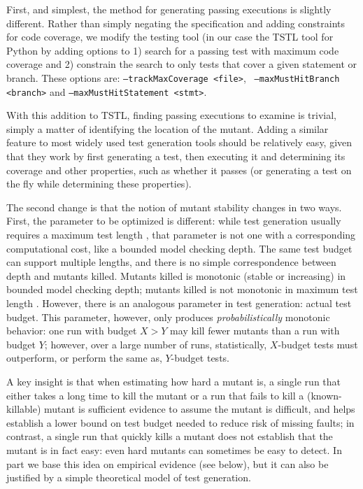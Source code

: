 \documentclass{svjour3}
\begin{document}
First, and simplest, the method for generating passing executions is
slightly different.  Rather than simply negating the specification and
adding constraints for code coverage, we modify the testing tool (in
our case the TSTL tool for Python \cite{tstlsttt,NFM15} by adding
options to 1) search for a passing test with maximum code coverage and
2) constrain the search to only tests that cover a given statement or
branch.  These options are:  {\tt --trackMaxCoverage <file>}, {\tt
  --maxMustHitBranch <branch>} and {\tt --maxMustHitStatement <stmt>}.

With this addition to TSTL, finding passing executions to examine is
trivial, simply a matter of identifying the location of the mutant.
Adding a similar feature to most widely used test generation tools
should be
relatively easy, given that they work by first generating a test, then
executing it and determining its coverage and other properties, such as
whether it passes (or generating a test on the fly while determining
these properties).  

The second change is that the notion of mutant stability changes in
two ways.  First, the parameter to be optimized is different:  while
test generation usually requires a maximum test length \cite{ASE08},
that parameter is not one with a corresponding computational cost,
like a bounded model checking depth.  The same test budget can support
multiple lengths, and there is no simple correspondence between depth
and mutants killed.  Mutants killed is monotonic (stable or
increasing) in bounded model checking depth; mutants killed is not
monotonic in maximum test length \cite{ASE08}.  However, there is an
analogous parameter in test generation:  actual test budget.  This
parameter, however, only produces \emph{probabilistically} \cite{arcuri2014hitchhiker} monotonic
behavior:  one run with budget $X > Y$ may kill fewer mutants than a
run with budget $Y$; however, over a large number of runs,
statistically, $X$-budget tests must outperform, or perform the same
as, $Y$-budget tests.

A key insight is that when estimating how hard a mutant is, a single
run that either takes a long time to kill the mutant or a run that
fails to kill a (known-killable) mutant is sufficient evidence to
assume the mutant is difficult, and helps establish a lower bound on
test budget needed to reduce risk of missing faults; in contrast, a
single run that quickly kills a mutant does not establish that the
mutant is in fact easy:  even hard mutants can sometimes be easy to
detect.  In part we base this idea on empirical evidence (see below),
but it can also be justified by a simple theoretical model of test
generation.  
\end{document}
